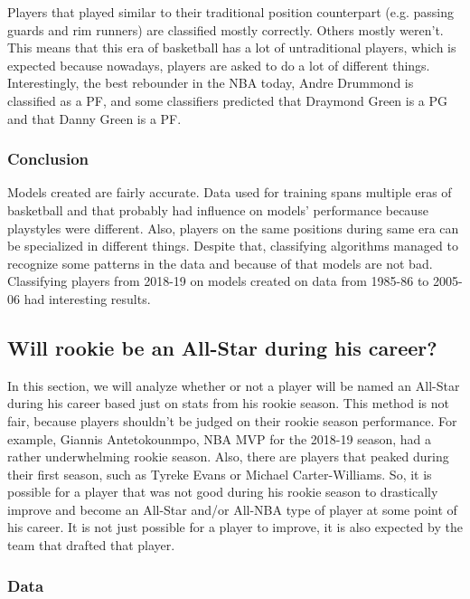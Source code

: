 \documentclass[a4paper]{article}
\begin{document}
Players that played similar to their traditional position counterpart (e.g. passing guards and rim runners) are classified mostly correctly. Others mostly weren't. This means that this era of basketball has a lot of untraditional players, which is expected because nowadays, players are asked to do a lot of different things. Interestingly, the best rebounder in the NBA today, Andre Drummond is classified as a PF, and some classifiers predicted that Draymond Green is a PG and that Danny Green is a PF. 

\subsubsection{Conclusion}
\label{subsubsec:pos_clf_conclusion}

Models created are fairly accurate. Data used for training spans multiple eras of basketball and that probably had influence on models' performance because playstyles were different. Also, players on the same positions during same era can be specialized in different things. Despite that, classifying algorithms managed to recognize some patterns in the data and because of that models are not bad. Classifying players from 2018-19 on models created on data from 1985-86 to 2005-06 had interesting results. 

\subsection{Will rookie be an All-Star during his career?}
\label{subsec:rookie_to_all_star}

In this section, we will analyze whether or not a player will be named an All-Star during his career based just on stats from his rookie season. This method is not fair, because players shouldn't be judged on their rookie season performance. For example, Giannis Antetokounmpo, NBA MVP for the 2018-19 season, had a rather underwhelming rookie season. Also, there are players that peaked during their first season, such as Tyreke Evans or Michael Carter-Williams. So, it is possible for a player that was not good during his rookie season to drastically improve and become an All-Star and/or All-NBA type of player at some point of his career. It is not just possible for a player to improve, it is also expected by the team that drafted that player.

\subsubsection{Data}
\label{subsubsec:data_all_star}
\end{document}
